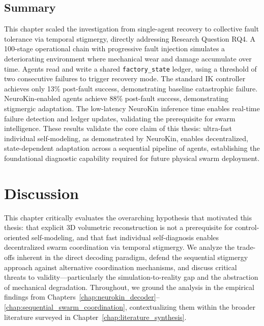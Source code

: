 \documentclass[12pt,a4paper,oneside]{report}
\begin{document}
\section{Summary}

This chapter scaled the investigation from single-agent recovery to collective fault tolerance via temporal stigmergy, directly addressing Research Question RQ4. A 100-stage operational chain with progressive fault injection simulates a deteriorating environment where mechanical wear and damage accumulate over time. Agents read and write a shared \texttt{factory\_state} ledger, using a threshold of two consecutive failures to trigger recovery mode. The standard IK controller achieves only 13\% post-fault success, demonstrating baseline catastrophic failure. NeuroKin-enabled agents achieve 88\% post-fault success, demonstrating stigmergic adaptation. The low-latency NeuroKin inference time enables real-time failure detection and ledger updates, validating the prerequisite for swarm intelligence. These results validate the core claim of this thesis: ultra-fast individual self-modeling, as demonstrated by NeuroKin, enables decentralized, state-dependent adaptation across a sequential pipeline of agents, establishing the foundational diagnostic capability required for future physical swarm deployment.





















\chapter{Discussion}
\label{chap:discussion}

This chapter critically evaluates the overarching hypothesis that motivated this thesis: that explicit 3D volumetric reconstruction is not a prerequisite for control-oriented self-modeling, and that fast individual self-diagnosis enables decentralized swarm coordination via temporal stigmergy. We analyze the trade-offs inherent in the direct decoding paradigm, defend the sequential stigmergy approach against alternative coordination mechanisms, and discuss critical threats to validity—particularly the simulation-to-reality gap and the abstraction of mechanical degradation. Throughout, we ground the analysis in the empirical findings from Chapters~\ref{chap:neurokin_decoder}--\ref{chap:sequential_swarm_coordination}, contextualizing them within the broader literature surveyed in Chapter~\ref{chap:literature_synthesis}.
\end{document}
